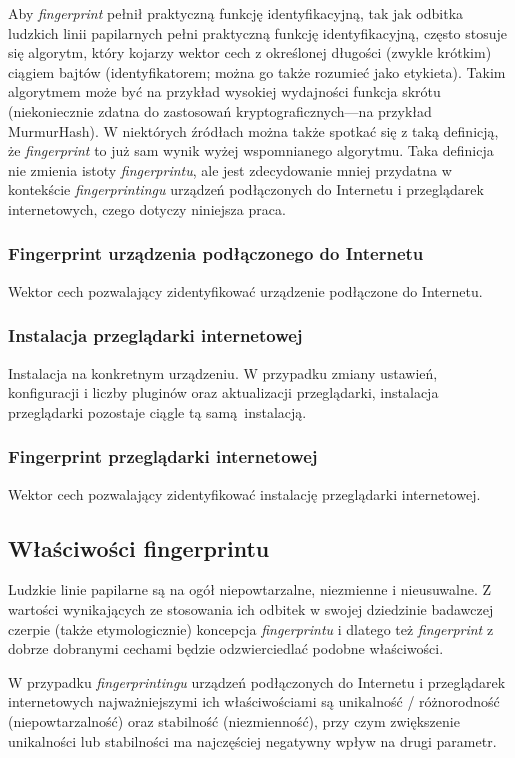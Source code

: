 Aby \emph{fingerprint} pełnił praktyczną funkcję identyfikacyjną, tak jak
odbitka ludzkich linii papilarnych pełni praktyczną funkcję identyfikacyjną,
często stosuje się algorytm, który kojarzy wektor cech z określonej długości
(zwykle krótkim) ciągiem bajtów (identyfikatorem; można go także rozumieć jako
etykieta). Takim algorytmem może być na przykład wysokiej wydajności funkcja
skrótu (niekoniecznie zdatna do zastosowań kryptograficznych---na przykład
MurmurHash). W niektórych źródłach można także spotkać się z taką definicją, że
\emph{fingerprint} to już sam wynik wyżej wspomnianego algorytmu. Taka definicja
nie zmienia istoty \emph{fingerprintu}, ale jest zdecydowanie mniej przydatna w
kontekście \emph{fingerprintingu} urządzeń podłączonych do Internetu i
przeglądarek internetowych, czego dotyczy niniejsza praca.

\subsubsection{Fingerprint urządzenia podłączonego do Internetu}
Wektor cech pozwalający zidentyfikować urządzenie podłączone do Internetu.

\subsubsection{Instalacja przeglądarki internetowej}
Instalacja na konkretnym urządzeniu. W przypadku zmiany ustawień, konfiguracji i
liczby pluginów oraz aktualizacji przeglądarki, instalacja przeglądarki
pozostaje ciągle tą samą instalacją.

\subsubsection{Fingerprint przeglądarki internetowej}
Wektor cech pozwalający zidentyfikować instalację przeglądarki internetowej.

\subsection{Właściwości fingerprintu}
Ludzkie linie papilarne są na ogół niepowtarzalne, niezmienne i nieusuwalne. Z
wartości wynikających ze stosowania ich odbitek w swojej dziedzinie badawczej
czerpie (także etymologicznie) koncepcja \emph{fingerprintu} i dlatego też
\emph{fingerprint} z dobrze dobranymi cechami będzie odzwierciedlać podobne
właściwości.

W przypadku \emph{fingerprintingu} urządzeń podłączonych do Internetu i
przeglądarek internetowych najważniejszymi ich właściwościami są unikalność /
różnorodność (niepowtarzalność) oraz stabilność (niezmienność), przy czym
zwiększenie unikalności lub stabilności ma najczęściej negatywny wpływ na drugi
parametr.


